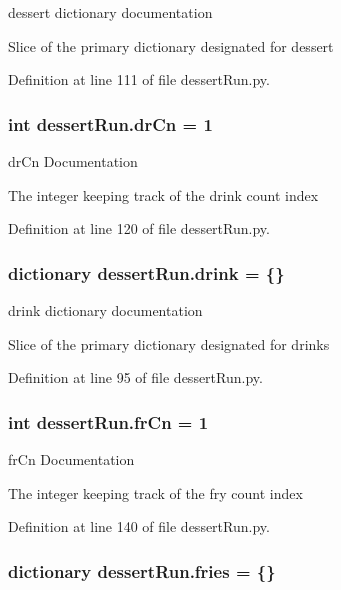 dessert dictionary documentation 

Slice of the primary dictionary designated for dessert 

Definition at line 111 of file dessert\-Run.\-py.

\hypertarget{namespacedessertRun_a24fc89b892225fce1672995dd2a6d153}{
\subsubsection[{dr\-Cn}]{\setlength{\rightskip}{0pt plus 5cm}int dessert\-Run.\-dr\-Cn = 1}}\label{namespacedessertRun_a24fc89b892225fce1672995dd2a6d153}


dr\-Cn Documentation 

The integer keeping track of the drink count index 

Definition at line 120 of file dessert\-Run.\-py.

\hypertarget{namespacedessertRun_a6d74dd7f27dfad5267f173798e5c3623}{
\subsubsection[{drink}]{\setlength{\rightskip}{0pt plus 5cm}dictionary dessert\-Run.\-drink = \{\}}}\label{namespacedessertRun_a6d74dd7f27dfad5267f173798e5c3623}


drink dictionary documentation 

Slice of the primary dictionary designated for drinks 

Definition at line 95 of file dessert\-Run.\-py.

\hypertarget{namespacedessertRun_af00fce1904a38fa79326b02eba27099b}{
\subsubsection[{fr\-Cn}]{\setlength{\rightskip}{0pt plus 5cm}int dessert\-Run.\-fr\-Cn = 1}}\label{namespacedessertRun_af00fce1904a38fa79326b02eba27099b}


fr\-Cn Documentation 

The integer keeping track of the fry count index 

Definition at line 140 of file dessert\-Run.\-py.

\hypertarget{namespacedessertRun_a865fccb585f44d25490e78ecf2b97236}{
\subsubsection[{fries}]{\setlength{\rightskip}{0pt plus 5cm}dictionary dessert\-Run.\-fries = \{\}}}\label{namespacedessertRun_a865fccb585f44d25490e78ecf2b97236}


